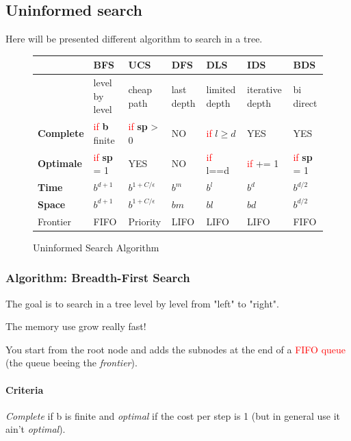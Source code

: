 \subsection{Uninformed search}
Here will be presented different algorithm to search in a tree.

\begin{figure}[h]
\centering
\begin{tabular}{|l|m{2cm}|m{2cm}|m{2cm}|m{2cm}|m{2cm}|m{2cm}|}
\hline
& \textbf{BFS} & \textbf{UCS} & \textbf{DFS} & \textbf{DLS} & \textbf{IDS} & \textbf {BDS}\\
\hline
& level by level & cheap path & last depth & limited depth & iterative depth & bi direct  \\

\hline
\hline
\textbf{Complete} & \textcolor{red}{if} \textbf{b} finite & \textcolor{red}{if} \textbf{sp} > 0  & NO  & \textcolor{red}{if} $l\geq d$ & YES & YES\\
\hline
\textbf{Optimale} & \textcolor{red}{if} \textbf{sp} = 1 & YES & NO & \textcolor{red}{if} l==d & \textcolor{red}{if} += 1 & \textcolor{red}{if} \textbf{sp} = 1 \\
\hline
\textbf{Time} & $b^{d+1}$    & $b^{1 + C/\epsilon}$ & $b^m$ & $b^l$ & $b^d$ & $b^{d/2}$\\
\hline
\textbf{Space} & $b^{d+1}$ & $b^{1 + C/\epsilon}$ & $bm$ & $bl$ & $bd$ & $b^{d/2}$ \\
\hline
Frontier & FIFO & Priority & LIFO & LIFO & LIFO & FIFO \\
\hline

\end{tabular}
\caption{Uninformed Search Algorithm}
\end{figure}


\subsubsection{Algorithm: Breadth-First Search}
The goal is to search in a tree level by level from "left" to "right".

The memory use grow really fast! 

You start from the root node and adds the subnodes at the end of a 
\textcolor{red}{FIFO queue} (the queue beeing the \textit{frontier}). 

\paragraph{Criteria} \textit{Complete} if b is finite and \textit{optimal} if the cost per
step is 1 (but in general use it ain't \textit{optimal}).

